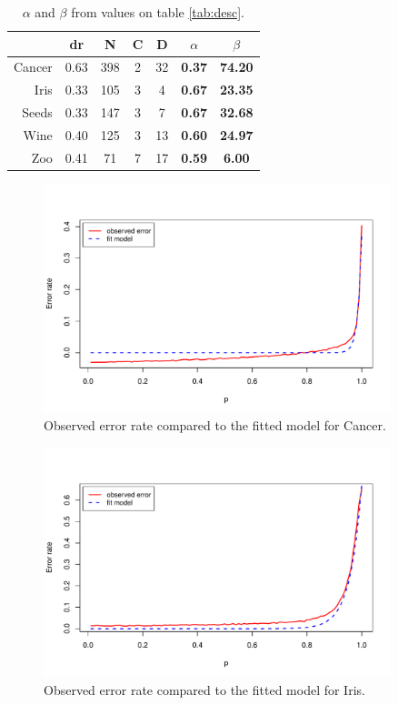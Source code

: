 \documentclass{article}
\begin{document}
\begin{table}
 \centering
 \begin{tabular}{rcccccc}
  \toprule
  & dr	& N	& C	& D 	& \boldmath$\alpha$	& \boldmath$\beta$	\\
  \midrule
  Cancer& 0.63	& 398	& 2	& 32 	& \textbf{0.37}	& \textbf{74.20}	\\
  Iris	& 0.33	& 105	& 3	& 4 	& \textbf{0.67}	& \textbf{23.35}	\\
  Seeds	& 0.33	& 147	& 3	& 7 	& \textbf{0.67}	& \textbf{32.68}	\\
  Wine	& 0.40	& 125	& 3	& 13 	& \textbf{0.60}	& \textbf{24.97}	\\
  Zoo	& 0.41	& 71	& 7	& 17 	& \textbf{0.59}	& \textbf{6.00}		\\
  \bottomrule
 \end{tabular}
 \caption{$\alpha$ and $\beta$ from values on table \ref{tab:desc}.}\label{tab:extend}
\end{table}

\begin{figure}
 \centering
 \includegraphics[width=0.9\textwidth]{./figures/cancer.pdf}
 \caption{Observed error rate compared to the fitted model for Cancer.}
 \label{fig:cancer}
\end{figure}

\begin{figure}
 \centering
 \includegraphics[width=0.9\textwidth]{./figures/iris.pdf}
 \caption{Observed error rate compared to the fitted model for Iris.}
 \label{fig:iris}
\end{figure}
\end{document}
